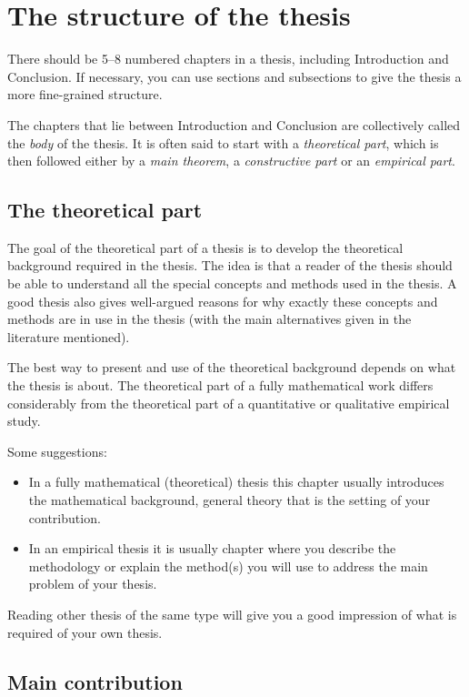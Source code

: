 \section{The structure of the thesis}

There should be 5--8 numbered chapters in a thesis, including
Introduction and Conclusion.  If necessary, you can use sections
and subsections to give the thesis a more fine-grained structure.

The chapters that lie between Introduction and Conclusion are 
collectively called the \textit{body} of the thesis.  It is
often said to start with a \textit{theoretical part}, which is then
followed either by a \textit{main theorem}, a \textit{constructive part}
or an \textit{empirical part}.

\subsection{The theoretical part}

The goal of the theoretical part of a thesis is to develop the
theoretical background required in the thesis.  The idea is that a
reader of the thesis should be able to understand all the special 
concepts and methods used in the thesis.
A good thesis also gives well-argued reasons for why exactly these
concepts and methods are in use in the thesis (with the main
alternatives given in the literature mentioned).

The best way to present and use of the theoretical background depends on
what the thesis is about. The theoretical part of a
fully mathematical work differs considerably from the theoretical part of a quantitative or qualitative
empirical study. 

Some suggestions:
\begin{itemize}
\item In a fully mathematical (theoretical) thesis this chapter usually introduces the 
mathematical background, general theory that is the setting of your contribution.
\item In an empirical thesis it is usually chapter where you describe the 
methodology or explain the method(s) you will use to address the main problem 
of your thesis.
\end{itemize}

Reading other thesis of the same type will give you a good impression
of what is required of your own thesis.

\subsection{Main contribution}

